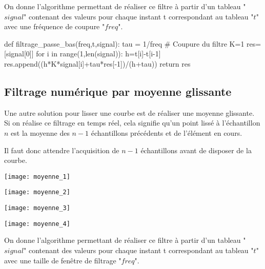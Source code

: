 On donne l'algorithme permettant de réaliser ce filtre à partir d'un tableau "$signal$" contenant des valeurs pour chaque instant t correspondant au tableau "$t$" avec une fréquence de coupure "$freq$".

\begin{pyverbatim}
def filtrage_passe_bas(freq,t,signal):
    tau = 1/freq # Coupure du filtre
    K=1
    res=[signal[0]]
    for i in range(1,len(signal)):
        h=t[i]-t[i-1]
        res.append((h*K*signal[i]+tau*res[-1])/(h+tau))
    return res
\end{pyverbatim}

\subsection*{Filtrage numérique par moyenne glissante}
Une autre solution pour lisser une courbe est de réaliser une moyenne glissante. Si on réalise ce filtrage en temps réel, cela signifie qu'un point lissé à l'échantillon $n$ est la moyenne des $n-1$ échantillons précédents et de l'élément en cours. 

Il faut donc attendre l'acquisition de $n-1$ échantillons avant de disposer de la courbe.


\begin{minipage}[c]{.43\linewidth}
\begin{center}
\texttt{[image: moyenne\_1]}
\end{center}
\end{minipage} \hfill
\begin{minipage}[c]{.43\linewidth}
\begin{center}
\texttt{[image: moyenne\_2]}
\end{center}
\end{minipage} 

\begin{minipage}[c]{.43\linewidth}
\begin{center}
\texttt{[image: moyenne\_3]}
\end{center}
\end{minipage} \hfill
\begin{minipage}[c]{.43\linewidth}
\begin{center}
\texttt{[image: moyenne\_4]}
\end{center}
\end{minipage}

On donne l'algorithme permettant de réaliser ce filtre à partir d'un tableau "$signal$" contenant des valeurs pour chaque instant t correspondant au tableau "$t$" avec une taille de fenêtre de filtrage "$freq$".

